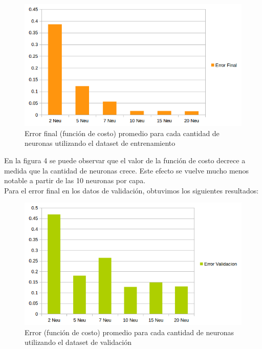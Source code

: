 \begin{figure}[h]
  \begin{center}
  \includegraphics[scale=0.75]{graficos/fig4_cant_neuro_error_final.png}
  \caption{Error final (función de costo) promedio para cada cantidad de neuronas utilizando el dataset de entrenamiento}
  \end{center}
\end{figure}

En la figura 4 se puede observar que el valor de la función de costo decrece a medida que la cantidad
de neuronas crece. Este efecto se vuelve mucho menos notable a partir de las 10 neuronas por capa.\\

Para el error final en los datos de validación, obtuvimos los siguientes resultados:\\

\begin{figure}[h]
  \begin{center}
  \includegraphics[scale=0.75]{graficos/fig5_cant_neuro_error_valid.png}
  \caption{Error (función de costo) promedio para cada cantidad de neuronas utilizando el dataset de validación}
  \end{center}
\end{figure}


